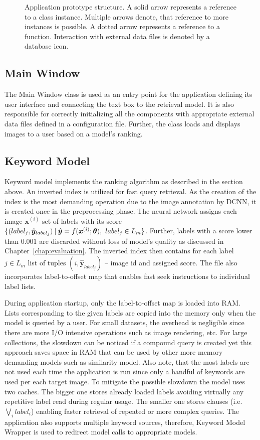 \begin{figure}[ht]
	\centering
	
	
	\caption[Application prototype structure]{Application prototype structure. A solid arrow represents a reference to a class instance. Multiple arrows denote, that reference to more instances is possible. A dotted arrow represents a reference to a function. Interaction with external data files is denoted by a database icon.}
	\label{fig:wpf_app}
\end{figure}

\subsection{Main Window}
The Main Window class is used as an entry point for the application defining its user interface and connecting the text box to the retrieval model. It is also responsible for correctly initializing all the components with appropriate external data files defined in a configuration file. Further, the class loads and displays images to a user based on a model's ranking.


\subsection{Keyword Model}
Keyword model implements the ranking algorithm as described in the section above. An inverted index is utilized for fast query retrieval. As the creation of the index is the most demanding operation due to the image annotation by DCNN, it is created once in the preprocessing phase. The neural network assigns each image $\bm{x}^{(i)}$ set of labels with its score $\{(label_j,\hat{\bm{y}}_{label_j})\:\vert\:{\hat{\bm{y}}=f(\bm{x}^{(i)};\bm{\theta})},\  {label_j\in L_m}\}$. Further, labels with a score lower than $0.001$ are discarded without loss of model's quality as discussed in Chapter~\ref{chap:evaluation}. The inverted index then contains for each label $j\in L_m$ list of tuples $(i, \hat{\bm{y}}_{label_j})$ -- image id and assigned score. The file also incorporates label-to-offset map that enables fast seek instructions to individual label lists.

During application startup, only the label-to-offset map is loaded into RAM. Lists corresponding to the given labels are copied into the memory only when the model is queried by a user. For small datasets, the overhead is negligible since there are more I/O intensive operations such as image rendering, etc. For large collections, the slowdown can be noticed if a compound query is created yet this approach saves space in RAM that can be used by other more memory demanding models such as similarity model. Also note, that the most labels are not used each time the application is run since only a handful of keywords are used per each target image. To mitigate the possible slowdown the model uses two caches. The bigger one stores already loaded labels avoiding virtually any repetitive label read during regular usage. The smaller one stores clauses (i.e. $\bigvee_i label_i$) enabling faster retrieval of repeated or more complex queries. The application also supports multiple keyword sources, therefore, Keyword Model Wrapper is used to redirect model calls to appropriate models.

